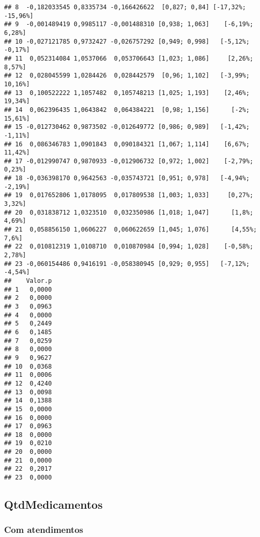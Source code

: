 \documentclass[
]{article}
\begin{document}
\begin{verbatim}
## 8  -0,182033545 0,8335734 -0,166426622  [0,827; 0,84] [-17,32%; -15,96%]
## 9  -0,001489419 0,9985117 -0,001488310 [0,938; 1,063]    [-6,19%; 6,28%]
## 10 -0,027121785 0,9732427 -0,026757292 [0,949; 0,998]   [-5,12%; -0,17%]
## 11  0,052314084 1,0537066  0,053706643 [1,023; 1,086]     [2,26%; 8,57%]
## 12  0,028045599 1,0284426  0,028442579  [0,96; 1,102]   [-3,99%; 10,16%]
## 13  0,100522222 1,1057482  0,105748213 [1,025; 1,193]    [2,46%; 19,34%]
## 14  0,062396435 1,0643842  0,064384221  [0,98; 1,156]      [-2%; 15,61%]
## 15 -0,012730462 0,9873502 -0,012649772 [0,986; 0,989]   [-1,42%; -1,11%]
## 16  0,086346783 1,0901843  0,090184321 [1,067; 1,114]    [6,67%; 11,42%]
## 17 -0,012990747 0,9870933 -0,012906732 [0,972; 1,002]    [-2,79%; 0,23%]
## 18 -0,036398170 0,9642563 -0,035743721 [0,951; 0,978]   [-4,94%; -2,19%]
## 19  0,017652806 1,0178095  0,017809538 [1,003; 1,033]     [0,27%; 3,32%]
## 20  0,031838712 1,0323510  0,032350986 [1,018; 1,047]      [1,8%; 4,69%]
## 21  0,058856150 1,0606227  0,060622659 [1,045; 1,076]      [4,55%; 7,6%]
## 22  0,010812319 1,0108710  0,010870984 [0,994; 1,028]    [-0,58%; 2,78%]
## 23 -0,060154486 0,9416191 -0,058380945 [0,929; 0,955]   [-7,12%; -4,54%]
##    Valor.p
## 1   0,0000
## 2   0,0000
## 3   0,0963
## 4   0,0000
## 5   0,2449
## 6   0,1485
## 7   0,0259
## 8   0,0000
## 9   0,9627
## 10  0,0368
## 11  0,0006
## 12  0,4240
## 13  0,0098
## 14  0,1388
## 15  0,0000
## 16  0,0000
## 17  0,0963
## 18  0,0000
## 19  0,0210
## 20  0,0000
## 21  0,0000
## 22  0,2017
## 23  0,0000
\end{verbatim}

\hypertarget{qtdmedicamentos}{%
\subsection{QtdMedicamentos}\label{qtdmedicamentos}}

\hypertarget{com-atendimentos-1}{%
\subsubsection{Com atendimentos}\label{com-atendimentos-1}}
\end{document}
